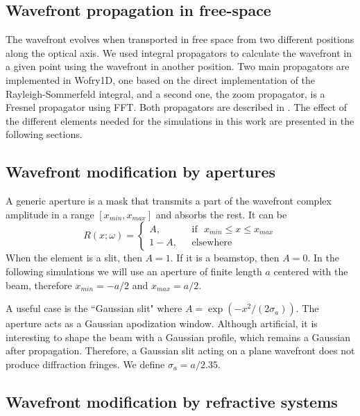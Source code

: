 \documentclass{iucr}              %
\begin{document}
\subsection{Wavefront propagation in free-space}

The wavefront evolves when transported in free space from two different positions along the optical axis. We used integral propagators to calculate the wavefront in a given point using the wavefront in another position. Two main propagators are implemented in Wofry1D, one based on the direct implementation of the  Rayleigh-Sommerfeld integral, and a second one, the zoom propagator, is a Fresnel propagator using FFT. Both propagators are described in . The effect of the different elements needed for the simulations in this work are presented in the following sections. 

\subsection{Wavefront modification by apertures}
\label{sec:gaussianslit}

A generic aperture is a mask that transmits a part of the wavefront complex amplitude in a range $[x_{min},x_{max}]$ and absorbs the rest. It can be
\begin{equation}
R(x;\omega) =
\left\{
\begin{matrix}
A,  & \mbox{~~if~~} x_{min} \le x \le x_{max}
\\ 
1 - A, & \mbox{~~elsewhere}
\end{matrix}
\right.
\end{equation}
When the element is a slit, then $A=1$. If it is a beamstop, then $A=0$. In the following simulations we will use an aperture of finite length $a$ centered with the beam, therefore $x_{min}=-a/2$ and $x_{max}=a/2$.

A useful case is the ``Gaussian slit" where $A=\exp(-x^2/(2\sigma_a))$. The aperture acts as a Gaussian apodization window. Although artificial, it is interesting to shape the beam with a Gaussian profile, which remains a Gaussian after propagation. Therefore, a Gaussian slit acting on a plane wavefront does not produce diffraction fringes.
We define $\sigma_a=a/2.35$.

\subsection{Wavefront modification by refractive systems}
\end{document}
